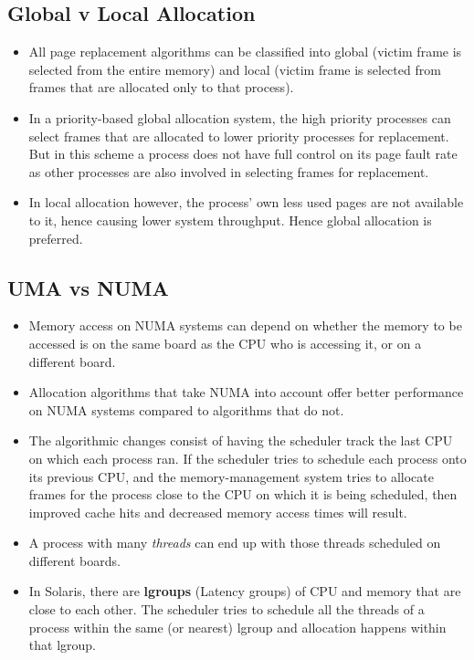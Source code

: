 \documentclass{article}
\theoremstyle{plain}
\theoremstyle{definition}
\begin{document}
\subsection{Global v Local Allocation}
\begin{itemize}
    \item All page replacement algorithms can be classified into global (victim frame is selected from the entire memory) and local (victim frame is selected from frames that are allocated only to that process).
    
    \item In a priority-based global allocation system, the high priority processes can select frames that are allocated to lower priority processes for replacement. But in this scheme a process does not have full control on its page fault rate as other processes are also involved in selecting frames for replacement.
    
    \item In local allocation however, the process' own less used pages are not available to it, hence causing lower system throughput. Hence global allocation is preferred.
\end{itemize}

\subsection{UMA vs NUMA}
\begin{itemize}
    \item Memory access on NUMA systems can depend on whether the memory to be accessed is on the same board as the CPU who is accessing it, or on a different board. 
    
    \item Allocation algorithms that take NUMA into account offer better performance on NUMA systems compared to algorithms that do not. 
    
    \item The algorithmic changes consist of having the scheduler track the last CPU on which each process ran. If the scheduler tries to schedule each process onto its previous CPU, and the memory-management system tries to allocate frames for the process close to the CPU on which it is being scheduled, then improved cache hits and decreased memory access times will result.
    
    \item A process with many \textit{threads} can end up with those threads scheduled on different boards. 
    
    \item In Solaris, there are \textbf{lgroups} (Latency groups) of CPU and memory that are close to each other. The scheduler tries to schedule all the threads of a process within the same (or nearest) lgroup and allocation happens within that lgroup. 

\end{itemize}
\end{document}
